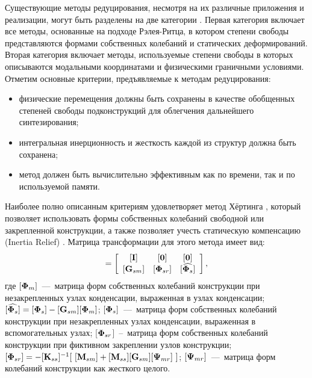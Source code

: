 Существующие методы редуцирования, несмотря на их различные приложения и реализации, могут быть разделены на две категории \cite{lib:cms:Herting}. Первая категория включает все методы, основанные на подходе Рэлея-Ритца, в котором степени свободы представляются формами собственных колебаний и статических деформирований. Вторая категория включает методы, используемые степени свободы в которых описываются модальными координатами и физическими граничными условиями. Отметим основные критерии, предъявляемые к методам редуцирования:
\begin{itemize}[noitemsep]
	\item физические перемещения должны быть сохранены в качестве обобщенных степеней свободы подконструкций для облегчения дальнейшего синтезирования;
	\item интегральная инерционность и жесткость каждой из структур должна быть сохранена;
	\item метод должен быть вычислительно эффективным как по времени, так и по используемой памяти.
\end{itemize}

Наиболее полно описанным критериям удовлетворяет метод Хёртинга \cite{lib:cms:Herting}, который позволяет использовать формы собственных колебаний свободной или закрепленной конструкции, а также позволяет учесть статическую компенсацию (Inertia Relief) \cite{lib:cms:Liao}. Матрица трансформации для этого метода имеет вид:
\begin{equation*}
[\mat{T}] = \left[ 
\begin{array}{c c c}
[\mat{I}] & [\mat{0}] & [\mat{0}]\\
{[\mat{G}_{sm}]} & [\mat{\Phi}_{sr}]& [\widehat{\mat{\Phi}_s}] \\
\end{array}
 \right],
\end{equation*}
где $ [\mathbf{\Phi}_m] $~---~матрица форм собственных колебаний конструкции при незакрепленных узлах конденсации, выраженная в узлах конденсации; $ [\widehat{\mathbf{\Phi}_s}] = [\mathbf{\Phi}_s] - [\mathbf{G}_{sm}][\mathbf{\Phi}_m]$; $[\mathbf{\Phi}_s]$~---~матрица форм собственных колебаний конструкции при незакрепленных узлах конденсации, выраженная в вспомогательных узлах; [$\mathbf{\Phi}_{sr}$]~--~матрица форм собственных колебаний конструкции при фиктивном закреплении узлов конструкции; $[\mathbf{\Phi}_{sr}] = -[\mathbf{K}_{ss}]^{-1}[\  [\mathbf{M}_{sm}]+[\mathbf{M}_{ss}][\mathbf{G}_{sm}][\mathbf{\Psi}_{mr}] \ ]$; $[\mathbf{\Psi}_{mr}]$~---~матрица форм колебаний конструкции как жесткого целого.

